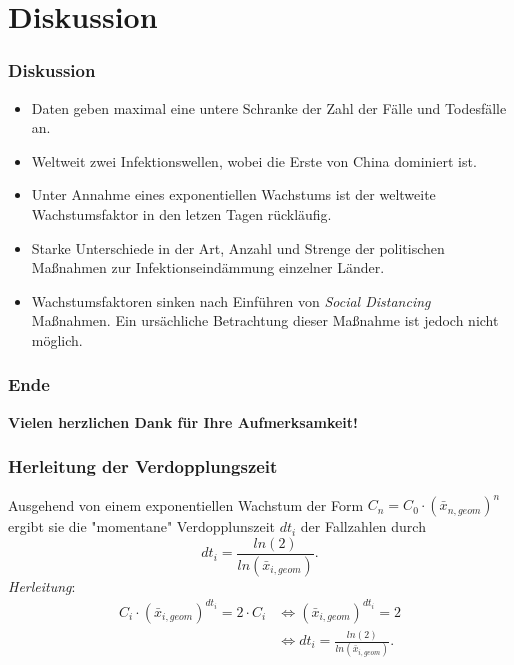\documentclass{beamer}
\begin{document}
\section{Diskussion}
\begin{frame}
	\frametitle{Diskussion}
	\begin{itemize}
		\item Daten geben maximal eine untere Schranke der Zahl der Fälle und Todesfälle an.
		\item Weltweit zwei Infektionswellen, wobei die Erste von China dominiert ist.
		\item Unter Annahme eines exponentiellen Wachstums ist der weltweite Wachstumsfaktor in den letzen Tagen rückläufig.
		\item Starke Unterschiede in der Art, Anzahl und Strenge der politischen Maßnahmen zur Infektionseindämmung einzelner Länder.
		\item Wachstumsfaktoren sinken nach Einführen von \emph{Social Distancing} Maßnahmen. Ein ursächliche Betrachtung dieser Maßnahme ist jedoch nicht möglich.
	\end{itemize}
\end{frame}

\begin{frame}
	\frametitle{Ende}
		\centering
		\textbf{Vielen herzlichen Dank für Ihre Aufmerksamkeit!}
\end{frame}
 
\begin{frame}
	\frametitle{Herleitung der Verdopplungszeit}
	Ausgehend von einem exponentiellen Wachstum der Form $C_n = C_0 \cdot (\bar{x}_{n, geom})^{n}$ ergibt sie die "momentane" Verdopplunszeit $dt_i$ der Fallzahlen durch $$dt_i = \frac{ln(2)}{ln(\bar{x}_{i, geom})}.$$
	\emph{Herleitung}: 
	\begin{align*} C_i \cdot (\bar{x}_{i, geom})^{dt_i} = 2 \cdot C_i 
		 &\iff (\bar{x}_{i, geom})^{dt_i} = 2 \\
	 	&\iff dt_i = \frac{ln(2)}{ln(\bar{x}_{i, geom})}.
	\end{align*}
\end{frame}
\end{document}

